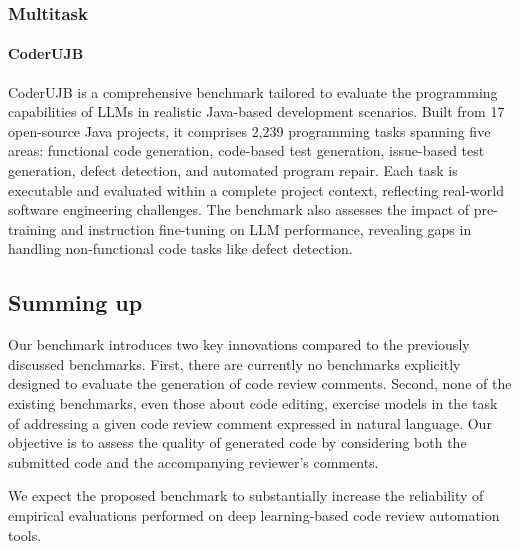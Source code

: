\subsubsection{Multitask}

\paragraph{CoderUJB \cite{zeng2024coderujb}}
CoderUJB is a comprehensive benchmark tailored to evaluate the programming
capabilities of LLMs in realistic Java-based development
scenarios. Built from 17 open-source Java projects, it comprises 2,239
programming tasks spanning five areas: functional code generation, code-based
test generation, issue-based test generation, defect detection, and automated
program repair. Each task is executable and evaluated within a complete project
context, reflecting real-world software engineering challenges. The benchmark
also assesses the impact of pre-training and instruction fine-tuning on LLM
performance, revealing gaps in handling non-functional code tasks like defect
detection.

\subsection{Summing up}

Our benchmark introduces two key innovations compared to the previously
discussed benchmarks. First, there are currently no benchmarks explicitly
designed to evaluate the generation of code review comments. Second, none of
the existing benchmarks, even those about code editing, exercise models in the
task of addressing a given code review comment expressed in natural language.
Our objective is to assess the quality of generated code by considering both
the submitted code and the accompanying reviewer's comments.

We expect the proposed benchmark to substantially increase the reliability of
empirical evaluations performed on deep learning-based code review automation
tools.
